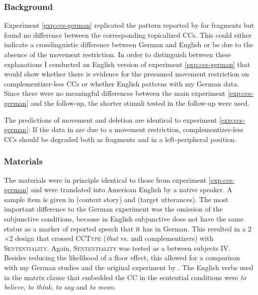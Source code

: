 \subsubsection{Background}
Experiment \ref{exp:ccs-german} replicated the pattern reported by \citet{merchant.etal2013} for fragments but found no difference between the corresponding topicalized CCs. This could either indicate a crosslinguistic difference between German and English or be due to the absence of the movement restriction. In order to distinguish between these explanations I conducted an English version of experiment \ref{exp:ccs-german} that would show whether there is evidence for the presumed movement restriction on complementizer-less CCs or whether English patterns with my German data. Since there were no meaningful differences between the main experiment \ref{exp:ccs-german} and the follow-up, the shorter stimuli tested in the follow-up were used.

The predictions of movement and deletion are identical to experiment \ref{exp:ccs-german}: If the data in \citet{merchant.etal2013} are due to a movement restriction, complementizer-less CCs should be degraded both as fragments and in a left-peripheral position.

\subsubsection{Materials}\label{sec:ccs-english-materials}
The materials were in principle identical to those from experiment \ref{exp:ccs-german} and were translated into American English by a native speaker. A sample item is given in \Next (context story) and \NNext (target utterances). The most important difference to the German experiment was the omission of the subjunctive conditions, because in English subjunctive does not have the same status as a marker of reported speech that it has in German. This resulted in a 2$\times$2 design that crossed \textsc{CCType} (\textit{that} vs. null complementizers) with \textsc{Sententiality}. Again, \textsc{Sententiality} was tested as a between subjects IV. Besides reducing the likelihood of a floor effect, this allowed for a comparison with my German studies and the original experiment by \citet{merchant.etal2013}. The English verbs used in the matrix clause that embedded the CC in the sentential conditions were \textit{to believe}, \textit{to think}, \textit{to say} and \textit{to mean}.

